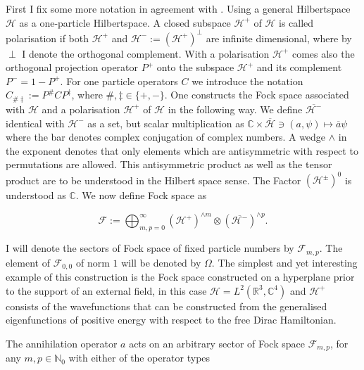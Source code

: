 \documentclass[b5paper,draft,openbib,12pt]{memoir}
\begin{document}
First I fix some more notation in agreement with \cite{ivp2}. Using a general Hilbertspace \(\mathcal{H}\) as a one-particle Hilbertspace. 
A closed subspace \(\mathcal{H}^+\) of \(\mathcal{H}\) is called polarisation if both \(\mathcal{H}^+\) and \(\mathcal{H}^-:=\left(\mathcal{H}^+\right)^\perp\)
are infinite dimensional, where by \(\perp\) I denote the orthogonal complement. With a polarisation \(\mathcal{H}^+\) comes also the orthogonal
projection operator \(P^+\) onto the subspace \(\mathcal{H}^+\) and its complement \(P^-=1-P^+\). For one particle operators \(C\) we 
introduce the notation \(C_{\#\ddag}:= P^\# C P^\ddag\), where \(\#,\ddag\in\{+,-\}\).
One constructs the Fock space associated with \(\mathcal{H}\) and a polarisation \(\mathcal{H}^+\) of \(\mathcal{H}\) in the following way.
We define \(\overline{\mathcal{H}^-}\) identical with \(\mathcal{H}^-\) as a set, but scalar multiplication as 
\(\mathbb{C}\times \overline{\mathcal{H}} \ni (a, \psi)\mapsto \overline{a} \psi\) where the bar denotes complex conjugation of complex numbers.
A wedge \(\wedge\) in the exponent denotes that only elements which are antisymmetric with respect to permutations
are allowed. This antisymmetric product as well as the tensor product are to be understood in the Hilbert space sense. 
The Factor \(\left(\mathcal{H}^{\pm}\right)^0\) is understood as
\(\mathbb{C}\). We now define Fock space as

\begin{equation}
\mathcal{F}:=\bigoplus_{m,p=0}^\infty \left(\mathcal{H}^+ \right)^{\wedge m} \otimes \left(\overline{\mathcal{H}^- }\right)^{\wedge p}.
\end{equation}

I will denote the sectors of Fock space of fixed particle
numbers by \(\mathcal{F}_{m,p}\). The element of
\(\mathcal{F}_{0,0}\) of norm \(1\) will be denoted by \(\Omega\).
The simplest and yet interesting example of this construction is
the Fock space constructed on a hyperplane prior to the support of an external field,
in this case \(\mathcal{H}=L^2(\mathbb{R}^3,\mathbb{C}^4)\) and \(\mathcal{H}^+\)
consists of the wavefunctions that can be constructed from the generalised eigenfunctions
of positive energy with respect to the free Dirac Hamiltonian.

The
annihilation operator \(a\) acts on an arbitrary sector of Fock space
\(\mathcal{F}_{m,p}\), for any \(m,p\in\mathbb{N}_0\) with either of the operator types
\end{document}
